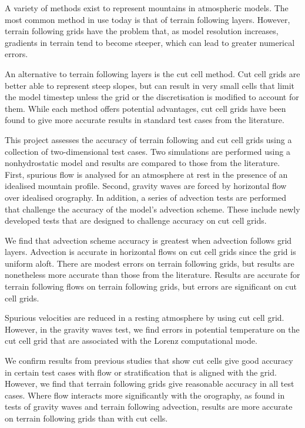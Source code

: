 A variety of methods exist to represent mountains in atmospheric models.  The most common method in use today is that of terrain following layers.  However, terrain following grids have the problem that, as model resolution increases, gradients in terrain tend to become steeper, which can lead to greater numerical errors.

An alternative to terrain following layers is the cut cell method.  Cut cell grids are better able to represent steep slopes, but can result in very small cells that limit the model timestep unless the grid or the discretisation is modified to account for them.
While each method offers potential advantages, cut cell grids have been found to give more accurate results in standard test cases from the literature.

This project assesses the accuracy of terrain following and cut cell grids using a collection of two-dimensional test cases.  Two simulations are performed using a nonhydrostatic model and results are compared to those from the literature.  First, spurious flow is analysed for an atmosphere at rest in the presence of an idealised mountain profile.  Second, gravity waves are forced by horizontal flow over idealised orography.  In addition, a series of advection tests are performed that challenge the accuracy of the model's advection scheme.  These include newly developed tests that are designed to challenge accuracy on cut cell grids.

We find that advection scheme accuracy is greatest when advection follows grid layers.  Advection is accurate in horizontal flows on cut cell grids since the grid is uniform aloft.  There are modest errors on terrain following grids, but results are nonetheless more accurate than those from the literature.  Results are accurate for terrain following flows on terrain following grids, but errors are significant on cut cell grids.

Spurious velocities are reduced in a resting atmosphere by using cut cell grid.  However, in the gravity waves test, we find errors in potential temperature on the cut cell grid that are associated with the Lorenz computational mode.

We confirm results from previous studies that show cut cells give good accuracy in certain test cases with flow or stratification that is aligned with the grid.  However, we find that terrain following grids give reasonable accuracy in all test cases.  Where flow interacts more significantly with the orography, as found in tests of gravity waves and terrain following advection, results are more accurate on terrain following grids than with cut cells.
